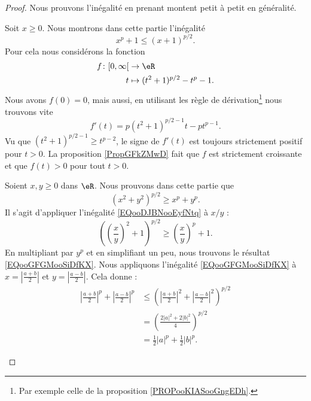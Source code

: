 	\begin{proof}
		Nous prouvons l'inégalité en prenant montent petit à petit en généralité.
		\begin{subproof}
			\spitem[Avec \( x>0\)]
			Soit \( x\geq 0\). Nous montrons dans cette partie l'inégalité
			\begin{equation}        \label{EQooDJBNooEyfNtq}
				x^p+1\leq (x+1)^{p/2}.
			\end{equation}
			Pour cela nous considérons la fonction
			\begin{equation}
				\begin{aligned}
					f\colon \mathopen[ 0 , \infty \mathclose[ & \to \eR                      \\
					t                                         & \mapsto (t^2+1)^{p/2}-t^p-1.
				\end{aligned}
			\end{equation}
			Nous avons \( f(0)=0\), mais aussi, en utilisant les règle de dérivation\footnote{Par exemple celle de la proposition \ref{PROPooKIASooGngEDh}.} nous trouvons vite
			\begin{equation}
				f'(t)=p(t^2+1)^{p/2-1}t-pt^{p-1}.
			\end{equation}
			Vu que \( (t^2+1)^{p/2-1}\geq t^{p-2}\), le signe de \( f'(t)\) est toujours strictement positif pour \( t>0\). La proposition \ref{PropGFkZMwD} fait que \( f\) est strictement croissante et que \( f(t)>0\) pour tout \( t>0\).

			Soient \( x,y\geq 0\) dans \( \eR\). Nous prouvons dans cette partie que
			\begin{equation}        \label{EQooGFGMooSiDfKX}
				(x^2+y^2)^{p/2}\geq x^p+y^p.
			\end{equation}
			Il s'agit d'appliquer l'inégalité \eqref{EQooDJBNooEyfNtq} à \( x/y\) :
			\begin{equation}
				\left( \left( \frac{ x }{ y } \right)^2+1 \right)^{p/2}\geq \left( \frac{ x }{ y } \right)^p+1.
			\end{equation}
			En multipliant par \( y^p\) et en simplifiant un peu, nous trouvons le résultat \eqref{EQooGFGMooSiDfKX}.
			\spitem[Avec \( a,b\in \eC\)]
			Nous appliquons l'inégalité \eqref{EQooGFGMooSiDfKX} à \( x=| \frac{ a+b }{ 2 } |\) et \( y=| \frac{ a-b }{2} |\). Cela donne :
			\begin{subequations}
				\begin{align}
					\left| \frac{ a+b }{2} \right|^p+\left| \frac{ a-b }{2} \right|^p & \leq \left( \left| \frac{ a+b }{2} \right|^2+\left| \frac{ a-b }{2} \right|^2 \right)^{p/2} \\
					                                                                  & =\left( \frac{ 2| a |^2+2| b |^2 }{ 4 } \right)^{p/2}                                       \\
					                                                                  & =\frac{ 1 }{2}| a |^p+\frac{ 1 }{2}| b |^p.
				\end{align}
			\end{subequations}
		\end{subproof}
	\end{proof}

